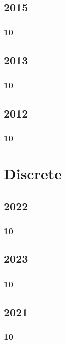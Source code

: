 \documentclass[11pt]{book}
\begin{document}
\section{2015}
\subsection{10}

\section{2013}
\subsection{10}

\section{2012}
\subsection{10}

%
%
%

\chapter{Discrete}
\section{2022}
\subsection{10}

\section{2023}
\subsection{10}

\section{2021}
\subsection{10}

\end{document}
